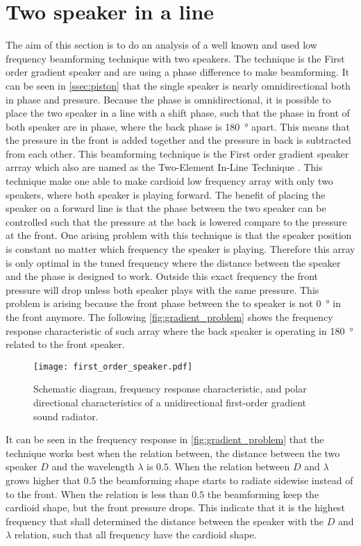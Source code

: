\section{Two speaker in a line}\label{sec:first_order_speaker}
The aim of this section is to do an analysis of a well known and used low frequency beamforming technique with two speakers. The technique is the First order gradient speaker and are using a phase difference to make beamforming.
It can be seen in \autoref{ssec:piston} that the single speaker is nearly omnidirectional both in phase and pressure. Because the phase is omnidirectional, it is possible to place the two speaker in a line with a shift phase, such that the phase in front of both speaker are in phase, where the back phase is \SI{180}{\degree} apart. This means that the pressure in the front is added together and the pressure in back is subtracted from each other. This beamforming technique is the First order gradient speaker arrray \citep{olson1973gradient} which also are named as the Two-Element In-Line Technique \citep{McCarthy2016}. This technique make one able to make cardioid low frequency array with only two speakers, where both speaker is playing forward. The benefit of placing the speaker on a forward line is that the phase between the two speaker can be controlled such that the pressure at the back is lowered compare to the pressure at the front. One arising problem with this technique is that the speaker position is constant no matter which frequency the speaker is playing. Therefore this array is only optimal in the tuned frequency where the distance between the speaker and the phase is designed to work. Outside this exact frequency the front pressure will drop unless both speaker plays with the same pressure. This problem is arising because the front phase between the to speaker is not \SI{0}{\degree} in the front anymore. The following \autoref{fig:gradient_problem} shows the frequency response characteristic of such array where the back speaker is operating in \SI{180}{\degree} related to the front speaker.

\begin{figure}[H]
	\centering
	\texttt{[image: first\_order\_speaker.pdf]}
	\caption{Schematic diagram, frequency response characteristic, and polar directional characteristics of a unidirectional first-order gradient sound radiator. \citep{olson1973gradient}}
		\label{fig:gradient_problem}
\end{figure}

It can be seen in the frequency response in \autoref{fig:gradient_problem} that the technique works best when the relation between, the distance between the two speaker $D$ and the wavelength $\lambda$ is $0.5$. When the relation between $D$ and $\lambda$ grows higher that $0.5$ the beamforming shape starts to radiate sidewise instead of to the front. When the relation is less than $0.5$ the beamforming keep the cardioid shape, but the front pressure drops. This indicate that it is the highest frequency that shall determined the distance between the speaker with the $D$ and $\lambda$ relation, such that all frequency have the cardioid shape.\\ 

